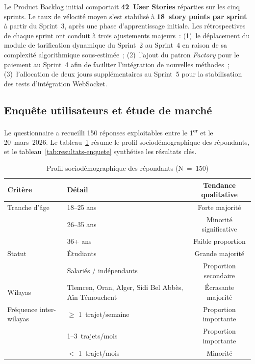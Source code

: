 Le Product Backlog initial comportait \textbf{42~User Stories} réparties sur les cinq sprints. Le taux de vélocité moyen s'est stabilisé à \textbf{18~story points par sprint} à partir du Sprint~3, après une phase d'apprentissage initiale. Les rétrospectives de chaque sprint ont conduit à trois ajustements majeurs~: (1)~le déplacement du module de tarification dynamique du Sprint~2 au Sprint~4 en raison de sa complexité algorithmique sous-estimée~; (2)~l'ajout du patron \textit{Factory} pour le paiement au Sprint~4 afin de faciliter l'intégration de nouvelles méthodes~; (3)~l'allocation de deux jours supplémentaires au Sprint~5 pour la stabilisation des tests d'intégration WebSocket.

\subsection{Enquête utilisateurs et étude de marché}
\label{sec:resultats-enquete}

Le questionnaire a recueilli 150 réponses exploitables entre le 1\textsuperscript{er} et le 20~mars~2026. Le tableau~\ref{tab:profil-repondants} résume le profil sociodémographique des répondants, et le tableau~\ref{tab:resultats-enquete} synthétise les résultats clés.

\begin{table}[H]
\centering
\footnotesize
\begin{tabularx}{\textwidth}{|l|X|c|}
\hline
\rowcolor{rohlight}
\textbf{Critère} & \textbf{Détail} & \textbf{Tendance qualitative} \\
\hline
Tranche d'âge & 18--25 ans & Forte majorité \\
\hline
 & 26--35 ans & Minorité significative \\
\hline
 & 36+ ans & Faible proportion \\
\hline
Statut & Étudiants & Grande majorité \\
\hline
 & Salariés / indépendants & Proportion secondaire \\
\hline
Wilayas & Tlemcen, Oran, Alger, Sidi Bel Abbès, Aïn Témouchent & Écrasante majorité \\
\hline
Fréquence inter-wilayas & $\geq$ 1~trajet/semaine & Proportion importante \\
\hline
 & 1--3~trajets/mois & Proportion importante \\
\hline
 & $<$ 1~trajet/mois & Minorité \\
\hline
\end{tabularx}
  \caption{Profil sociodémographique des répondants (N~=~150)}
  \label{tab:profil-repondants}
\end{table}

